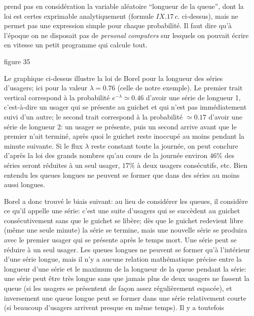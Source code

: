 prend pas en consid\'eration la variable al\'eatoire ``longueur de la 
queue'', dont  la loi est certes exprimable analytiquement (formule 
$IX.17\, c.$ ci-dessus), mais ne permet pas une expression simple pour 
chaque probabilit\'e. Il faut dire qu'\`a l'\'epoque on ne disposait pas de  
{\it personal computers} sur lesquels on pouvait \'ecrire en vitesse un 
petit programme qui calcule tout.  
\medskip 
\midinsert 
\vskip3pt
\centerline{} 
\vskip-1mm
\centerline{\eightpoint figure 35} 
\vskip6pt 
\centerline{\vbox{\hsize=12cm\eightpoint  
Le graphique ci-dessus illustre la loi de Borel pour la longueur des 
s\'eries d'usagers; ici pour la valeur $\lambda = 0.76$ (celle de notre 
exemple). Le premier trait vertical correspond \`a la probabilit\'e 
$e^{-\lambda } \simeq 0.46$ d'avoir une s\'erie de longueur 1, 
c'est-\`a-dire un usager qui se pr\'esente au guichet et qui n'est pas 
imm\'ediatement suivi d'un autre; le second trait correspond \`a la  
probabilit\'e $\simeq 0.17$ d'avoir une s\'erie de longueur 2: un usager  
se pr\'esente, puis un second arrive avant que le premier n'ait termin\'e, 
apr\`es quoi le guichet reste inoccup\'e au  moins pendant la  minute 
suivante. Si le flux $\lambda$ reste constant toute la journ\'ee, on peut 
conclure d'apr\`es la loi des grands nombres qu'au cours de la journ\'ee 
environ $46\%$ des s\'eries seront r\'eduites \`a un seul usager, $17\%$ 
\`a deux usagers cons\'ecutifs, etc. Bien entendu les queues longues ne 
peuvent se former que dans des s\'eries au moins aussi longues.}}   
\endinsert 
Borel a donc trouv\'e le biais suivant: 
au lieu de consid\'erer les queues, il consid\`ere ce qu'il appelle une 
s\'erie: c'est une suite d'usagers qui se succ\`edent au guichet 
cons\'ecutivement sans que le guichet se lib\`ere; d\`es que le guichet 
redevient libre (m\^eme une seule minute) la s\'erie se termine, mais  
une nouvelle s\'erie se produira avec le premier usager qui se pr\'esente 
apr\`es le temps mort. Une s\'erie peut se r\'eduire \`a un seul usager. 
Les queues longues ne peuvent se former qu'\`a l'int\'erieur d'une 
s\'erie longue, mais il n'y a aucune relation math\'ematique pr\'ecise  
entre la longueur d'une s\'erie et le maximum de la longueur de la queue 
pendant la s\'erie: une s\'erie peut \^etre tr\`es longue sans que jamais 
plus de deux usagers ne fassent la queue (si les usagers se pr\'esentent 
de fa\c{c}on assez r\'eguli\`erement espac\'ee),  et inversement une 
queue longue peut se former dans une s\'erie relativement courte (si 
beaucoup d'usagers arrivent presque en m\^eme temps). Il y a toutefois 
